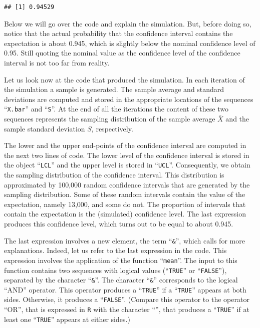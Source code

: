 \documentclass[]{krantz}
\theoremstyle{definition}
\theoremstyle{definition}
\theoremstyle{definition}
\theoremstyle{remark}
\begin{document}
\begin{verbatim}
## [1] 0.94529
\end{verbatim}

Below we will go over the code and explain the simulation. But, before
doing so, notice that the actual probability that the confidence
interval contains the expectation is about 0.945, which is slightly
below the nominal confidence level of 0.95. Still quoting the nominal
value as the confidence level of the confidence interval is not too far
from reality.

Let us look now at the code that produced the simulation. In each
iteration of the simulation a sample is generated. The sample average
and standard deviations are computed and stored in the appropriate
locations of the sequences ``\texttt{X.bar}'' and ``\texttt{S}''. At the
end of all the iterations the content of these two sequences represents
the sampling distribution of the sample average \(\bar X\) and the
sample standard deviation \(S\), respectively.

The lower and the upper end-points of the confidence interval are
computed in the next two lines of code. The lower level of the
confidence interval is stored in the object ``\texttt{LCL}'' and the
upper level is stored in ``\texttt{UCL}''. Consequently, we obtain the
sampling distribution of the confidence interval. This distribution is
approximated by 100,000 random confidence intervals that are generated
by the sampling distribution. Some of these random intervals contain the
value of the expectation, namely 13,000, and some do not. The proportion
of intervals that contain the expectation is the (simulated) confidence
level. The last expression produces this confidence level, which turns
out to be equal to about 0.945.

The last expression involves a new element, the term ``\texttt{\&}'',
which calls for more explanations. Indeed, let us refer to the last
expression in the code. This expression involves the application of the
function ``\texttt{mean}''. The input to this function contains two
sequences with logical values (``\texttt{TRUE}'' or ``\texttt{FALSE}''),
separated by the character ``\texttt{\&}''. The character
``\texttt{\&}'' corresponds to the logical ``AND'' operator. This
operator produces a ``\texttt{TRUE}'' if a ``\texttt{TRUE}'' appears at
both sides. Otherwise, it produces a ``\texttt{FALSE}''. (Compare this
operator to the operator ``OR'', that is expressed in \texttt{R} with
the character ``\texttt{\textbar{}}'', that produces a ``\texttt{TRUE}''
if at least one ``\texttt{TRUE}'' appears at either sides.)
\end{document}
